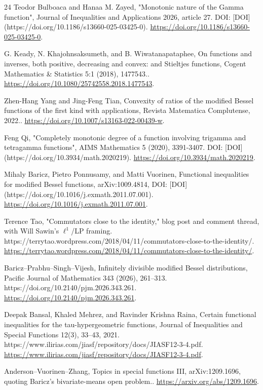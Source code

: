 \documentclass[11pt]{article}
\numberwithin{equation}{section}
\theoremstyle{definition}
\theoremstyle{remark}
\newcommand{\1}{\mathbf 1}
\begin{document}
\begin{thebibliography}{24}
Teodor Bulboaca and Hanaa M. Zayed, "Monotonic nature of the Gamma function", Journal of Inequalities and Applications 2026, article 27. DOI: [DOI](https://doi.org/10.1186/s13660-025-03425-0).
\url{https://doi.org/10.1186/s13660-025-03425-0}.

G. Keady, N. Khajohnsaksumeth, and B. Wiwatanapataphee, On functions and inverses, both positive, decreasing and convex: and Stieltjes functions, Cogent Mathematics \& Statistics 5:1 (2018), 1477543..
\url{https://doi.org/10.1080/25742558.2018.1477543}.

Zhen-Hang Yang and Jing-Feng Tian, Convexity of ratios of the modified Bessel functions of the first kind with applications, Revista Matematica Complutense, 2022..
\url{https://doi.org/10.1007/s13163-022-00439-w}.

Feng Qi, "Completely monotonic degree of a function involving trigamma and tetragamma functions", AIMS Mathematics 5 (2020), 3391-3407. DOI: [DOI](https://doi.org/10.3934/math.2020219).
\url{https://doi.org/10.3934/math.2020219}.

Mihaly Baricz, Pietro Ponnusamy, and Matti Vuorinen, Functional inequalities for modified Bessel functions, arXiv:1009.4814, DOI: [DOI](https://doi.org/10.1016/j.exmath.2011.07.001).
\url{https://doi.org/10.1016/j.exmath.2011.07.001}.

Terence Tao, "Commutators close to the identity," blog post and comment thread, with Will Sawin's \(\ell^1\)/LP framing. https://terrytao.wordpress.com/2018/04/11/commutators-close-to-the-identity/.
\url{https://terrytao.wordpress.com/2018/04/11/commutators-close-to-the-identity/}.

Baricz--Prabhu--Singh--Vijesh, Infinitely divisible modified Bessel distributions, Pacific Journal of Mathematics 343 (2026), 261--313. https://doi.org/10.2140/pjm.2026.343.261.
\url{https://doi.org/10.2140/pjm.2026.343.261}.

Deepak Bansal, Khaled Mehrez, and Ravinder Krishna Raina, Certain functional inequalities for the tau-hypergeometric functions, Journal of Inequalities and Special Functions 12(3), 33--43, 2021. https://www.ilirias.com/jiasf/repository/docs/JIASF12-3-4.pdf.
\url{https://www.ilirias.com/jiasf/repository/docs/JIASF12-3-4.pdf}.

Anderson--Vuorinen--Zhang, Topics in special functions III, arXiv:1209.1696, quoting Baricz's bivariate-means open problem..
\url{https://arxiv.org/abs/1209.1696}.


\end{thebibliography}
\end{document}
